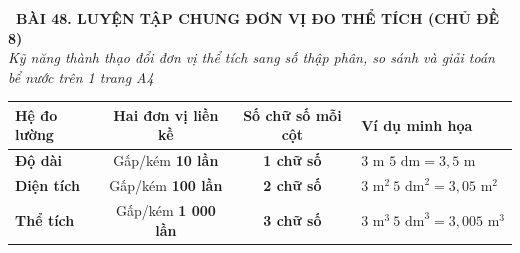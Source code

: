 \documentclass[14pt,a4paper,oneside]{extbook}
\begin{document}
\noindent
\begin{tcolorbox}[
  enhanced,
  colback=teal!8!white,
  colframe=teal!80!black,
  arc=3mm,
  boxrule=1.1pt,
  width=\linewidth,
  halign=center,
  top=2.2mm, bottom=2.2mm,
  left=3mm, right=3mm,
  drop fuzzy shadow
]
  {\large\bfseries\color{teal!95!black}\faBookmark\ BÀI 48. LUYỆN TẬP CHUNG ĐƠN VỊ ĐO THỂ TÍCH (CHỦ ĐỀ 8)}\\[2pt]
  {\scriptsize\color{black!75}\itshape Kỹ năng thành thạo đổi đơn vị thể tích sang số thập phân, so sánh và giải toán bể nước trên 1 trang A4}
\end{tcolorbox}

\vspace{3.2mm}
\noindent
\begin{tcolorbox}[
  enhanced,
  title={\footnotesize\bfseries\color{white}\faTable\ 1. Bảng so sánh bước nhảy giữa 3 hệ đơn vị đo lường},
  colback=blue!2!white,
  colframe=blue!75!black,
  arc=2.5mm, boxrule=0.8pt, top=1.8mm, bottom=1.8mm, left=2mm, right=2mm
]
  \scriptsize
  \centering
  \begin{tabular}{|l|c|c|l|}
    \hline
    \textbf{Hệ đo lường} & \textbf{Hai đơn vị liền kề} & \textbf{Số chữ số mỗi cột} & \textbf{Ví dụ minh họa} \\ \hline
    \textbf{Độ dài} & Gấp/kém \textbf{10 lần} & \textbf{1 chữ số} & $3\text{ m } 5\text{ dm} = 3,5\text{ m}$ \\ \hline
    \textbf{Diện tích} & Gấp/kém \textbf{100 lần} & \textbf{2 chữ số} & $3\text{ m}^2\ 5\text{ dm}^2 = 3,05\text{ m}^2$ \\ \hline
    \textbf{Thể tích} & Gấp/kém \textbf{1 000 lần} & \textbf{3 chữ số} & $3\text{ m}^3\ 5\text{ dm}^3 = 3,005\text{ m}^3$ \\ \hline
  \end{tabular}
\end{tcolorbox}

\vspace{3mm}
\end{document}
